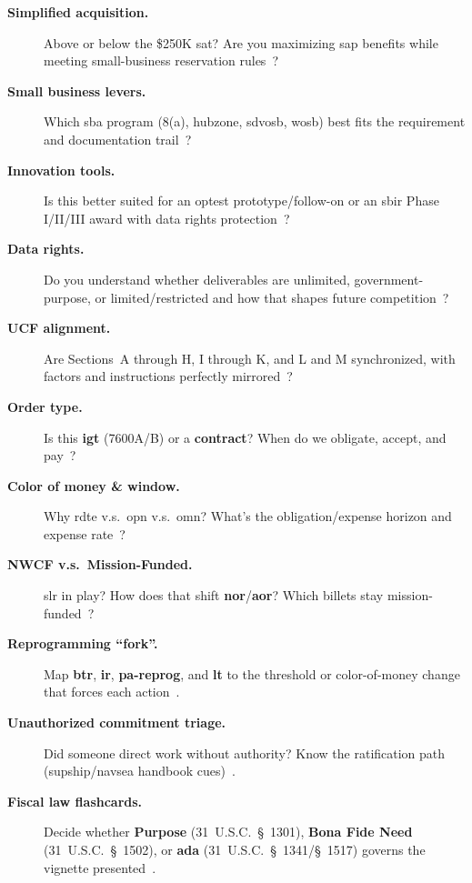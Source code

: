 \documentclass[../main.tex]{subfiles}
\begin{document}
\begin{description}
  \item[\textbf{Simplified acquisition.}] Above or below the \$250K \ac{sat}? Are you maximizing \ac{sap} benefits while meeting small-business reservation rules~\autocite{FAR}?
  \item[\textbf{Small business levers.}] Which \ac{sba} program (8(a), \ac{hubzone}, \ac{sdvosb}, \ac{wosb}) best fits the requirement and documentation trail~\autocite{FAR}?
  \item[\textbf{Innovation tools.}] Is this better suited for an \ac{optest} prototype/follow-on or an \ac{sbir} Phase I/II/III award with data rights protection~\autocite{USC-4021-OTA,USC-4022-OTF,USC-638-SBIR}?
  \item[\textbf{Data rights.}] Do you understand whether deliverables are unlimited, government-purpose, or limited/restricted and how that shapes future competition~\autocite{DFARS}?
  \item[\textbf{UCF alignment.}] Are Sections~A through H, I through K, and L and M synchronized, with factors and instructions perfectly mirrored~\autocite{FAR,NAVSEA-Source-Selection-Guide-2022}?
  \item[\textbf{Order type.}] Is this \textbf{\ac{igt}} (7600A/B) or a \textbf{contract}? When do we obligate, accept, and pay~\autocite{DoDFMR-Vol3,Treasury-GInvoicing}?
  \item[\textbf{Color of money \& window.}] Why \ac{rdte} v.s.\ \ac{opn} v.s.\ \ac{omn}? What's the obligation/expense horizon and expense rate~\autocite{DoDFMR-Vol3}?
  \item[\textbf{NWCF v.s.\ Mission-Funded.}] \ac{slr} in play? How does that shift \textbf{\ac{nor}}/\textbf{\ac{aor}}? Which billets stay mission-funded~\autocite{DoDFMR-Vol3}?
  \item[\textbf{Reprogramming ``fork''.}] Map \textbf{\ac{btr}}, \textbf{\ac{ir}}, \textbf{\ac{pa-reprog}}, and \textbf{\ac{lt}} to the threshold or color-of-money change that forces each action~\autocite{DoDFMR-Vol3}.
  \item[\textbf{Unauthorized commitment triage.}] Did someone direct work without authority? Know the ratification path (\ac{supship}/\ac{navsea} handbook cues)~\autocite{SOM-Ch3-2023,NAVSEA-Contracts-Handbook-2023}.
  \item[\textbf{Fiscal law flashcards.}] Decide whether \textbf{Purpose} (31~U.S.C.~\S~1301), \textbf{Bona Fide Need} (31~U.S.C.~\S~1502), or \textbf{\ac{ada}} (31~U.S.C.~\S~1341/\S~1517) governs the vignette presented~\autocite{USC-1301-Purpose,USC-1502-BFN,USC-1341-ADA}.

\end{description}
\end{document}
